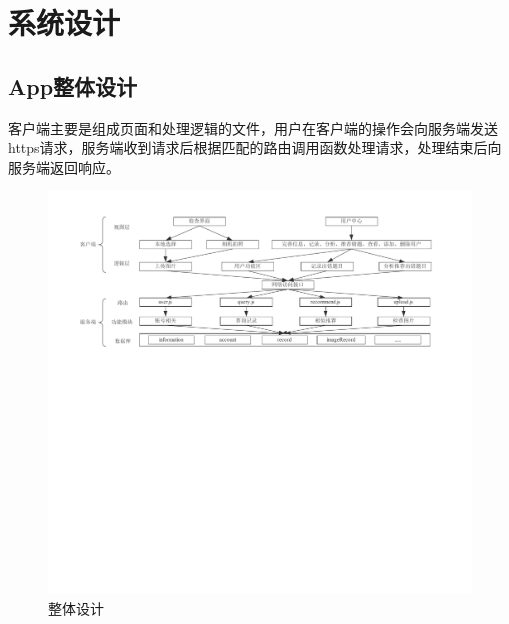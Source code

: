
\chapter{系统设计}

\section{App整体设计}
客户端主要是组成页面和处理逻辑的文件，用户在客户端的操作会向服务端发送https请求，服务端收到请求后根据匹配的路由调用函数处理请求，处理结束后向服务端返回响应。
\begin{figure}[h]
	\centering
	\includegraphics[width=350bp]{picture/overallDesign.pdf}
	\caption{整体设计}
	\label{fig:}
\end{figure}
\par
